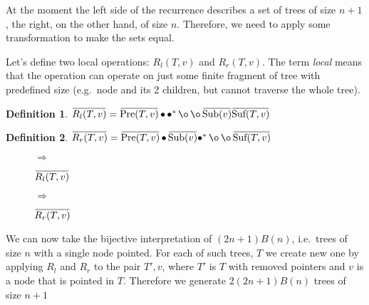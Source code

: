 \documentclass[final]{article}
\theoremstyle{definition}
\newtheorem{definition}{Definition}[subsection]
\theoremstyle{remark}
\newcommand{\ols}[1]{\mskip.5\thinmuskip\overline{\mskip-.5\thinmuskip {#1} \mskip-.5\thinmuskip}\mskip.5\thinmuskip} %
\newcommand{\enc}[1]{\ensuremath{\ols{#1}}}
\newcommand{\pointed}[1]{\ensuremath{{#1}^*}}
\DeclareMathOperator{\tSub}{\text{Sub}}
\DeclareMathOperator{\tPre}{\text{Pre}}
\DeclareMathOperator{\tSuf}{\text{Suf}}
\DeclareMathOperator{\n}{\bullet}
\DeclareMathOperator{\no}{\o}
\begin{document}
At the moment the left side of the recurrence describes a set of trees of size \(n + 1\), the right, on the other hand, of size \(n\). Therefore, we need to apply some transformation to make the sets equal.

Let's define two local operations: \(R_l(T, v)\) and \(R_r(T, v)\). The term \textit{local} means that the operation can operate on just some finite fragment of tree with predefined size (e.g.\ node and its 2 children, but cannot traverse the whole tree).

\begin{definition}
    \(\enc{R_l(T, v)} = \enc{\tPre(T, v)} \n \pointed{\n} \no \no \enc{\tSub(v)} \enc{\tSuf(T, v)}\)
\end{definition}

\begin{definition}
    \(\enc{R_r(T, v)} = \enc{\tPre(T, v)} \n \enc{\tSub(v)} \pointed{\n} \no \no \enc{\tSuf(T, v)} \)
\end{definition}

\begin{figure}[H]
    \centering
    \begin{minipage}{.25\textwidth}\end{minipage}%
    \(\Rightarrow\)
    \begin{minipage}{.4\textwidth}\end{minipage}%
    \caption{\(\enc{R_l(T, v)}\)}
    \label{fig:remy_left}
\end{figure}

\begin{figure}[H]
    \centering
    \begin{minipage}{.25\textwidth}\end{minipage}%
    \(\Rightarrow\)
    \begin{minipage}{.4\textwidth}\end{minipage}%
    \caption{\(\enc{R_r(T, v)}\)}
    \label{fig:remy_right}
\end{figure}

We can now take the bijective interpretation of \((2n + 1) B(n)\), i.e.\ trees of size \(n\) with a single node pointed. For each of such trees, \(T\) we create new one by applying \(R_l\) and \(R_r\) to the pair \(T', v\), where \(T'\) is \(T\) with removed pointers and \(v\) is a node that is pointed in \(T\). Therefore we generate \(2(2n + 1) B(n)\) trees of size \(n + 1\)
\end{document}
